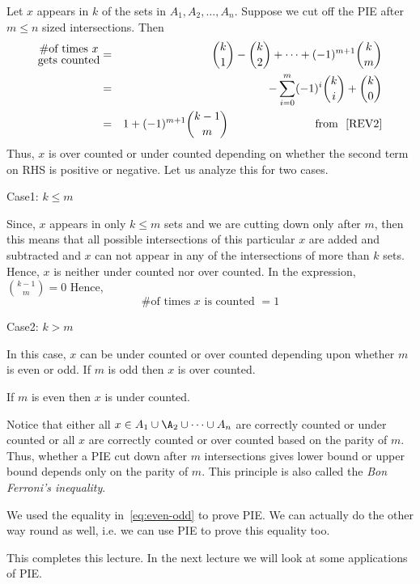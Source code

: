 Let $x$ appears in $k$ of the sets in $A_1, A_2, \ldots, A_n$. Suppose we cut off the PIE after $m\le n$ sized intersections. Then 
\begin{eqnarray*} 
{\Large\substack{\# \text{of times $x$}\\ \text{gets counted}}} &=& {k\choose 1}-{k\choose 2}+\cdots+(-1)^{m+1}{k\choose m}\\
&=&-\sum_{i=0}^m(-1)^{i}{k\choose i}+{k\choose 0}\\
&=& 1+(-1)^{m+1}{k-1\choose m} ~~~~~~~~~~~~~~~~~~~~~~~\text{from ~\eqref{REV2}}
\end{eqnarray*}
Thus, $x$ is over counted or under counted depending on whether the second term on RHS is positive or negative. Let us analyze this for two cases.
\begin{description}
\item Case1: $k\le m$

Since, $x$ appears in only $k\le m$ sets and we are cutting down only after $m$, then this means that all possible intersections of this particular $x$ are added and subtracted and $x$ can not appear in any of the intersections of more than $k$ sets. Hence, $x$ is neither under counted nor over counted. In the expression, ${k-1\choose m} = 0$ Hence,
$$\# \text{of times $x$ is counted } = 1$$
\item Case2: $k>m$

In this case, $x$ can be under counted or over counted depending upon whether $m$ is even or odd.
If $m$ is odd then $x$ is over counted.

If $m$ is even then $x$ is under counted.
\end{description}
Notice that either all $x\in A_1\cup\A_2\cup\cdots\cup A_n$ are correctly counted or under counted or all $x$ are correctly counted or over counted based on the parity of $m$. Thus, whether a PIE cut down after $m$ intersections gives lower bound or upper bound depends only on the parity of $m$. This principle is also called the \emph{Bon Ferroni's inequality}. 
\begin{remark} 
    We used the equality in~\eqref{eq:even-odd} to prove PIE. We can actually do the other way round as well, i.e. we can use PIE to prove this equality too.
\end{remark}
This completes this lecture. In the next lecture we will look at some applications of PIE.

